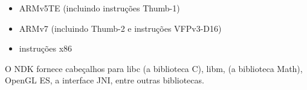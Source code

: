 \begin{itemize}
    \item ARMv5TE (incluindo instruções Thumb-1)
    \item ARMv7 (incluindo Thumb-2 e instruções VFPv3-D16)
    \item instruções x86
\end{itemize}

O NDK fornece cabeçalhos para libc (a biblioteca C), libm, (a biblioteca Math), 
OpenGL ES, a interface JNI, entre outras bibliotecas.


